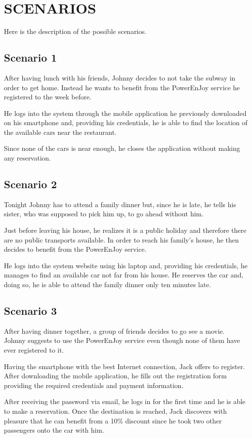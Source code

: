 \section{SCENARIOS}
Here is the description of the possible scenarios.
\subsection{Scenario 1}
After having lunch with his friends, Johnny decides to not take the subway in order to get home. Instead he wants to benefit from the PowerEnJoy service he registered to the week before. 

He logs into the system through the mobile application he previously downloaded on his smartphone and, providing his credentials, he is able to find the location of the available cars near the restaurant. 

Since none of the cars is near enough, he closes the application without making any reservation. 
\subsection{Scenario 2}
Tonight Johnny has to attend a family dinner but, since he is late, he tells his sister, who was supposed to pick him up, to go ahead without him. 

Just before leaving his house, he realizes it is a public holiday and therefore there are no public transports available. In order to reach his family's house, he then decides to benefit from the PowerEnJoy service. 

He logs into the system website using his laptop and, providing his credentials, he manages to find an available car not far from his house. He reserves the car and, doing so, he is able to attend the family dinner only ten minutes late.
\subsection{Scenario 3}
After having dinner together, a group of friends decides to go see a movie. Johnny suggests to use the PowerEnJoy service even though none of them have ever registered to it. 

Having the smartphone with the best Internet connection, Jack offers to register. After downloading the mobile application, he fills out the registration form providing the required credentials and payment information. 

After receiving the password via email, he logs in for the first time and he is able to make a reservation. Once the destination is reached, Jack discovers with pleasure that he can benefit from a 10\% discount since he took two other passengers onto the car with him. 

